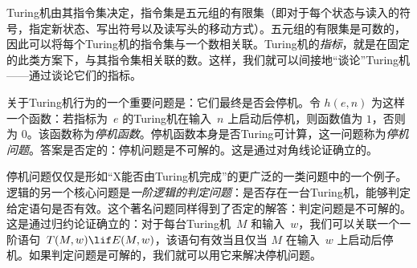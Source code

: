 Turing机由其指令集决定，指令集是五元组的有限集（即对于每个状态与读入的符号，指定新状态、写出符号以及读写头的移动方式）。五元组的有限集是可数的，因此可以将每个Turing机的指令集与一个数相关联。Turing机的\emph{指标}，就是在固定的此类方案下，与其指令集相关联的数。这样，我们就可以间接地“谈论”Turing机——通过谈论它们的指标。

关于Turing机行为的一个重要问题是：它们最终是否会停机。令 $h(e, n)$ 为这样一个函数：若指标为~$e$ 的Turing机在输入~$n$ 上启动后停机，则函数值为 $1$，否则为 $0$。该函数称为\emph{停机函数}。停机函数本身是否Turing可计算，这一问题称为\emph{停机问题}。答案是否定的：停机问题是不可解的。这是通过对角线论证确立的。

停机问题仅仅是形如“X能否由Turing机完成”的更广泛的一类问题中的一个例子。逻辑的另一个核心问题是\emph{一阶逻辑的判定问题}：是否存在一台Turing机，能够判定给定语句是否有效。这个著名问题同样得到了否定的解答：判定问题是不可解的。这是通过归约论证确立的：对于每台Turing机~$M$ 和输入~$w$，我们可以关联一个一阶语句~$T(M, w) \lif E(M, w)$，该语句有效当且仅当 $M$ 在输入~$w$ 上启动后停机。如果判定问题是可解的，我们就可以用它来解决停机问题。
